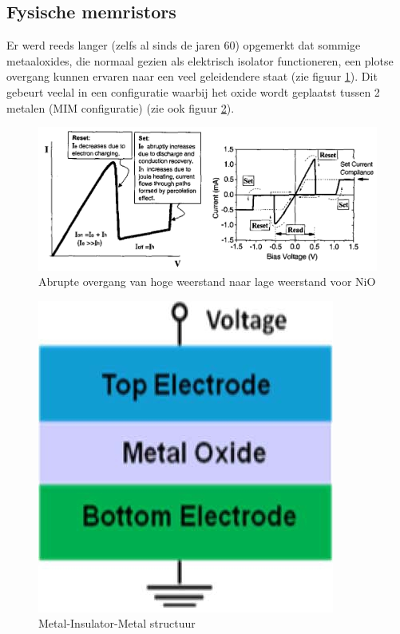 \subsection{Fysische memristors}
Er werd reeds langer (zelfs al sinds de jaren 60) opgemerkt dat sommige metaaloxides, die normaal gezien als elektrisch isolator functioneren, een plotse overgang kunnen ervaren naar een veel geleidendere staat (zie figuur \ref{fig:i-v}). Dit gebeurt veelal in een configuratie waarbij het oxide wordt geplaatst tussen 2 metalen (MIM configuratie)\cite{Won12} (zie ook figuur \ref{fig:mim}).

\begin{figure}
  \centering
  \includegraphics[scale=0.25]{../fig/hfdstk-cel-I-V.png}
  \caption{Abrupte overgang van hoge weerstand naar lage weerstand voor NiO\cite{Bae04}}
  \label{fig:i-v}
\end{figure}

\begin{figure}
  \centering
  \includegraphics[scale=0.4]{../fig/hfdstk-cel-MIM.png}
  \caption{Metal-Insulator-Metal structuur\cite{Won12}}
  \label{fig:mim}
\end{figure}

